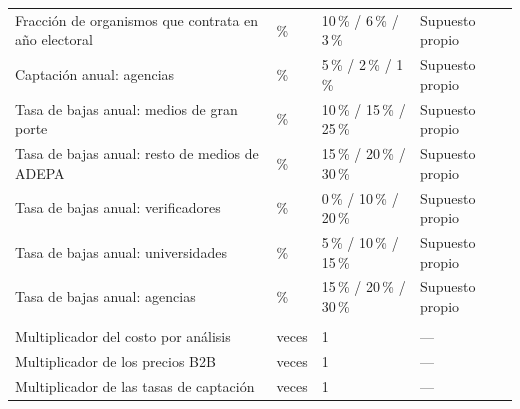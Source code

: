 {\begin{longtable}{@{}>{\raggedright\arraybackslash}p{5.2cm} p{2.1cm} p{2.4cm} >{\raggedright\arraybackslash}p{4.1cm}@{}}
    Fracción de organismos que contrata en año electoral & \% & 10\,\% / 6\,\% / 3\,\% & Supuesto propio \\
    Captación anual: agencias & \% & 5\,\% / 2\,\% / 1\,\% & Supuesto propio \\
    Tasa de bajas anual: medios de gran porte & \% & 10\,\% / 15\,\% / 25\,\% & Supuesto propio \\
    Tasa de bajas anual: resto de medios de ADEPA & \% & 15\,\% / 20\,\% / 30\,\% & Supuesto propio \\
    Tasa de bajas anual: verificadores & \% & 0\,\% / 10\,\% / 20\,\% & Supuesto propio \\
    Tasa de bajas anual: universidades & \% & 5\,\% / 10\,\% / 15\,\% & Supuesto propio \\
    Tasa de bajas anual: agencias & \% & 15\,\% / 20\,\% / 30\,\% & Supuesto propio \\
    \multicolumn{4}{@{}l}{\textit{Sensibilidad (1 = caso base)}} \\
    Multiplicador del costo por análisis & veces & 1 & — \\
    Multiplicador de los precios B2B & veces & 1 & — \\
    Multiplicador de las tasas de captación & veces & 1 & — \\
\end{longtable}
}
